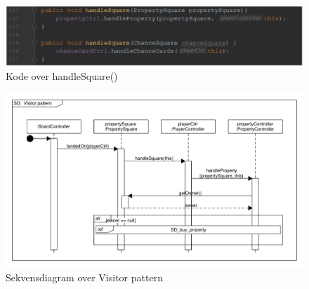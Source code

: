 \documentclass[class=article, crop=false]{standalone}
\begin{document}
        \begin{figure}[H]
        \centering

        \includegraphics[scale=0.5]{pics/handle_square.png}
        \caption{Kode over handleSquare()}\label{fig:handle_square}
    \end{figure}


    \begin{figure}[H]
        \centering

        \hbox{\hspace{-1cm}\includegraphics[scale=0.6]{diagrams/SD_landed_on.pdf}}
        \caption{Sekvensdiagram over Visitor pattern}\label{fig:SD_landed_on}
    \end{figure}
\end{document}
